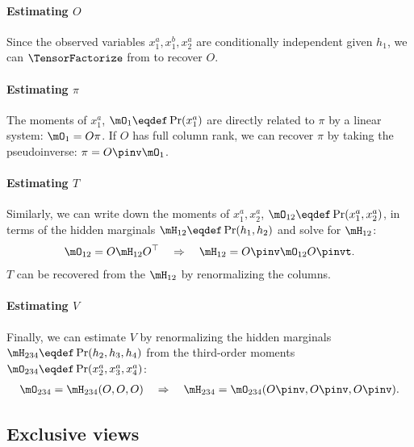 \paragraph{Estimating $O$}
Since the observed variables $x^a_1, x^b_1, x^a_2$ are
  conditionally independent given $h_1$, we can $\TensorFactorize$ from
   to recover $O$.

\paragraph{Estimating $\pi$}
The moments of $x^a_1$, $\mO_1 \eqdef \Pr(x^a_1)$ are directly related to
  $\pi$ by a linear system: $\mO_1 = O \pi$. 
If $O$ has full column rank, we can recover $\pi$ by taking the pseudoinverse: $\pi = O\pinv  \mO_1$.

\paragraph{Estimating $T$}
Similarly, we can write down the moments of $x^a_1, x^a_2$, $\mO_{12}
  \eqdef \Pr(x^a_1, x^a_2)$, in terms of the hidden marginals $\mH_{12}
  \eqdef \Pr(h_1, h_2)$ and solve for $\mH_{12}$:
\begin{align*}
\mO_{12} = O \mH_{12} O^\top \quad\Rightarrow\quad
  \mH_{12} = O\pinv  \mO_{12} O\pinvt .
\end{align*}
$T$ can be recovered from the $\mH_{12}$ by renormalizing the columns.

\paragraph{Estimating $V$}
Finally, we can estimate $V$ by renormalizing the hidden marginals
$\mH_{234} \eqdef \Pr(h_2, h_3, h_4)$ from the third-order moments
$\mO_{234} \eqdef \Pr(x^a_2, x^a_3, x^a_4)$:
\begin{align*}
  \mO_{234} = \mH_{234}(O, O, O) \quad\Rightarrow\quad
  \mH_{234} = \mO_{234}(O\pinv , O\pinv , O\pinv ).
\end{align*}

\subsection{Exclusive views}
\label{sec:general}


